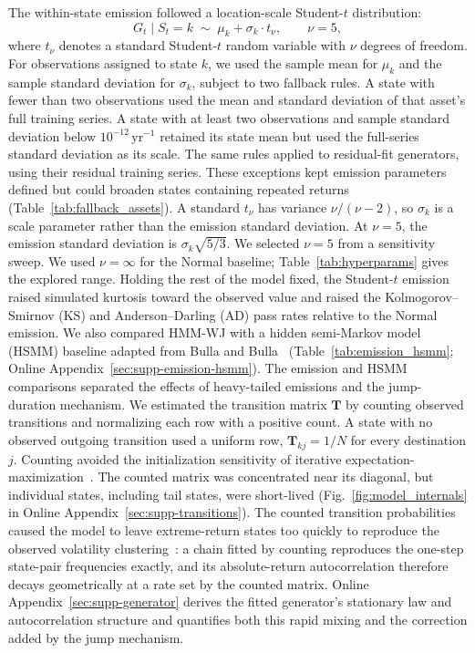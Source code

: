The within-state emission followed a location-scale Student-$t$
distribution:
\begin{equation}
    G_t \mid S_t = k \;\sim\; \mu_k + \sigma_k \cdot t_{\nu},
    \qquad \nu = 5,
    \label{eq:emission}
\end{equation}
where $t_\nu$ denotes a standard Student-$t$ random variable with
$\nu$ degrees of freedom. For observations assigned to state $k$,
we used the sample mean for $\mu_k$ and the sample standard
deviation for $\sigma_k$, subject to two fallback rules. A state
with fewer than two observations used the mean and standard
deviation of that asset's full training series. A state with at
least two observations and sample standard deviation below $10^{-12}\,\mathrm{yr}^{-1}$
retained its state mean but used the full-series standard deviation
as its scale. The same rules applied to residual-fit generators,
using their residual training series. These exceptions kept emission
parameters defined but could broaden states containing repeated
returns (Table~\ref{tab:fallback_assets}). A standard $t_\nu$ has
variance $\nu/(\nu-2)$, so
$\sigma_k$ is a scale parameter rather than the emission standard
deviation. At $\nu=5$, the emission standard deviation is
$\sigma_k\sqrt{5/3}$. We selected $\nu = 5$ from a sensitivity sweep.
We used $\nu = \infty$ for the Normal baseline; Table~\ref{tab:hyperparams}
gives the explored range. Holding the rest of the model fixed, the
Student-$t$ emission raised simulated kurtosis toward the observed
value and raised the Kolmogorov--Smirnov (KS) and Anderson--Darling
(AD) pass rates relative to the Normal emission. We also
compared HMM-WJ with a hidden semi-Markov model (HSMM) baseline
adapted from Bulla and Bulla~\cite{bullaBulla2006}
(Table~\ref{tab:emission_hsmm}; Online
Appendix~\ref{sec:supp-emission-hsmm}). The emission and HSMM
comparisons separated the effects of heavy-tailed emissions and the
jump-duration mechanism. We estimated the transition matrix $\mathbf{T}$
by counting observed transitions and normalizing each row with a
positive count. A state with no observed outgoing transition used
a uniform row, $\mathbf{T}_{kj}=1/N$ for every destination $j$.
Counting avoided the initialization sensitivity of iterative
expectation-maximization~\cite{bilmes1998}. The counted matrix was
concentrated near its diagonal, but individual states, including tail
states, were short-lived
(Fig.~\ref{fig:model_internals} in Online
Appendix~\ref{sec:supp-transitions}). The counted transition
probabilities caused the model to leave extreme-return states too
quickly to reproduce the observed
volatility clustering~\cite{bullaBulla2006}: a chain fitted by
counting reproduces the one-step state-pair frequencies exactly, and
its absolute-return autocorrelation therefore decays geometrically at
a rate set by the counted matrix. Online
Appendix~\ref{sec:supp-generator} derives the fitted generator's
stationary law and autocorrelation structure and quantifies both this
rapid mixing and the correction added by the jump mechanism.


